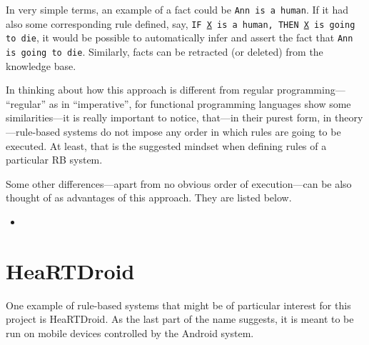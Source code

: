 In very simple terms, an example of a fact could be \texttt{Ann is a human}. If it had also some corresponding rule defined, say, \texttt{IF \underline{X} is a human, THEN \underline{X} is going to die}, it would be possible to automatically infer and assert the fact that \texttt{Ann is going to die}. Similarly, facts can be retracted (or deleted) from the knowledge base.

In thinking about how this approach is different from regular programming--- ``regular'' as in ``imperative'', for functional programming languages show some similarities---it is really important to notice, that---in their purest form, in theory---rule-based systems do not impose any order in which rules are going to be executed. At least, that is the suggested mindset when defining rules of a particular RB system.



Some other differences---apart from no obvious order of execution---can be also thought of as advantages of this approach. They are listed below.

\begin{itemize}
	\item {}
\end{itemize}

\section{HeaRTDroid}

One example of rule-based systems that might be of particular interest for this project is HeaRTDroid. As the last part of the name suggests, it is meant to be run on mobile devices controlled by the Android system.